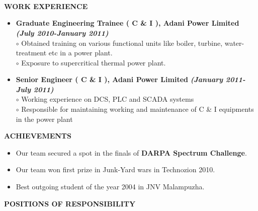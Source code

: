 \documentclass[a4paper,10pt]{article}
\begin{document}
{\qquad \\ \\ \\ \\ \\ \\ \\ \\ \\ \\ \\ \\ \\}

 \colorbox{titleColor}{\parbox{6.5in}{\textbf{WORK EXPERIENCE}}}

 \begin{itemize}
 \setlength{\itemsep}{1pt}
 \item \textbf{Graduate Engineering Trainee ( C \& I ), Adani Power Limited}  \textbf \emph{(July 2010-January 2011)}\\ 
 $\circ$ Obtained training on various functional units like boiler, turbine, water-treatment etc in a power plant.\\
 $\circ$ Exposure to supercritical thermal power plant.
 \item \textbf{Senior Engineer ( C \& I ), Adani Power Limited}  \textbf \emph{(January 2011-July 2011)}\\
 $\circ$ Working experience on DCS, PLC and SCADA systems \\
 $\circ$ Responsible for maintaining working and maintenance of C \& I equipments in the power plant
\end{itemize}

 \colorbox{titleColor}{\parbox{6.5in}{\textbf{ACHIEVEMENTS}}}

 \begin{itemize}
  \item Our team secured a spot in the finals of \textbf{DARPA Spectrum Challenge}.
  \item Our team won first prize in Junk-Yard wars in Technozion 2010.
  \item Best outgoing student of the year 2004 in JNV Malampuzha.
  \end{itemize}
  
 \colorbox{titleColor}{\parbox{6.5in}{\textbf{POSITIONS OF RESPONSIBILITY}}}
\end{document}
